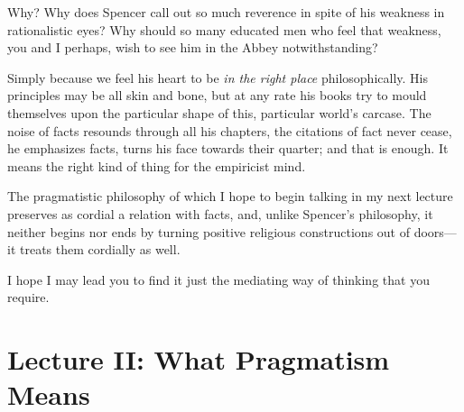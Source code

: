 \documentclass[]{article}
\begin{document}
Why? Why does Spencer call out so much reverence in spite of his
weakness in rationalistic eyes? Why should so many educated men who
feel that weakness, you and I perhaps, wish to see him in the Abbey
notwithstanding?

Simply because we feel his heart to be \emph{in the right place}
philosophically. His principles may be all skin and bone, but at any
rate his books try to mould themselves upon the particular shape of
this, particular world's carcase. The noise of facts resounds through
all his chapters, the citations of fact never cease, he emphasizes
facts, turns his face towards their quarter; and that is enough. It
means the right kind of thing for the empiricist mind.

The pragmatistic philosophy of which I hope to begin talking in my
next lecture preserves as cordial a relation with facts, and, unlike
Spencer's philosophy, it neither begins nor ends by turning positive
religious constructions out of doors--- it treats them cordially as well.

I hope I may lead you to find it just the mediating way of thinking that
you require.


\section{Lecture II: What Pragmatism Means}
\end{document}
